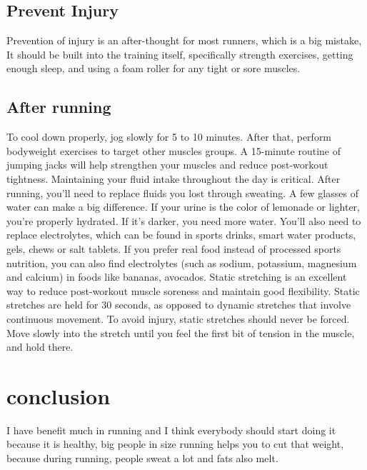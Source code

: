 \documentclass[a4paper,13pt]{article}
\begin{document}
\subsection{Prevent Injury}{
Prevention of injury is an after-thought for most runners, which is a big mistake, It should be built into the training itself, specifically strength exercises, getting enough sleep, and using a foam roller for any tight or sore muscles.}
\subsection{After running}{
To cool down properly, jog slowly for 5 to 10 minutes. After that, perform bodyweight exercises to target other muscles groups. A 15-minute routine of jumping jacks will help strengthen your muscles and reduce post-workout tightness.
Maintaining your fluid intake throughout the day is critical. After running, you'll need to replace fluids you lost through sweating. A few glasses of water can make a big difference. If your urine is the color of lemonade or lighter, you're properly hydrated. If it's darker, you need more water.
You'll also need to replace electrolytes, which can be found in sports drinks, smart water products, gels, chews or salt tablets. If you prefer real food instead of processed sports nutrition, you can also find electrolytes (such as sodium, potassium, magnesium and calcium) in foods like bananas, avocados.
 Static stretching is an excellent way to reduce post-workout muscle soreness and maintain good flexibility. Static stretches are held for 30 seconds, as opposed to dynamic stretches that involve continuous movement. To avoid injury, static stretches should never be forced. Move slowly into the stretch until you feel the first bit of tension in the muscle, and hold there.  }
\section{conclusion}{
I have benefit much in running and I think everybody should start doing it because it is healthy, big people in size running helps you to cut that weight, because during running, people sweat a lot and fats also melt.}
\end{document}
